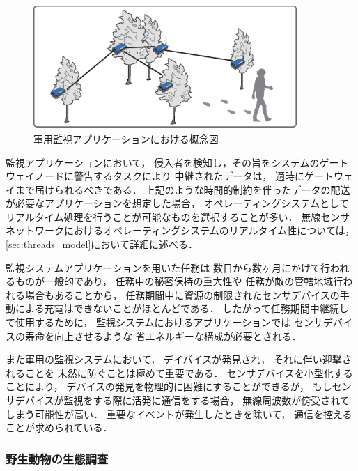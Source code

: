 \begin{figure}[htbp]
 \begin{center}
  \includegraphics[width=100mm]{./images/surveillance_system.eps}
 \end{center}
 \caption{軍用監視アプリケーションにおける概念図}
 \label{fig:surveillance_system}
\end{figure}


監視アプリケーションにおいて，
侵入者を検知し，その旨をシステムのゲートウェイノードに警告するタスクにより
中継されたデータは，
適時にゲートウェイまで届けられるべきである．
上記のような時間的制約を伴ったデータの配送が必要なアプリケーションを想定した場合，
オペレーティングシステムとして
リアルタイム処理を行うことが可能なものを選択することが多い．
無線センサネットワークにおけるオペレーティングシステムのリアルタイム性については，
\ref{sec:threads_model}において詳細に述べる．

監視システムアプリケーションを用いた任務は
数日から数ヶ月にかけて行われるものが一般的であり，
任務中の秘密保持の重大性や
任務が敵の管轄地域行われる場合もあることから，
任務期間中に資源の制限されたセンサデバイスの手動による充電はできないことがほとんどである．
したがって任務期間中継続して使用するために，
監視システムにおけるアプリケーションでは
センサデバイスの寿命を向上させるような
省エネルギーな構成が必要とされる．

また軍用の監視システムにおいて，
デイバイスが発見され，
それに伴い迎撃されることを
未然に防ぐことは極めて重要である．
センサデバイスを小型化することにより，
デバイスの発見を物理的に困難にすることができるが，
もしセンサデバイスが監視をする際に活発に通信をする場合，
無線周波数が傍受されてしまう可能性が高い．
重要なイベントが発生したときを除いて，
通信を控えることが求められている．





\subsubsection{野生動物の生態調査}

